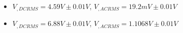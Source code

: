 \begin{itemize}
     \item $V_{, DCRMS}=4.59V\pm 0.01\unit{V}$, $V_{, ACRMS}=19.2mV\pm 0.01\unit{V}$ 
     \item $V_{, DCRMS}=6.88V\pm 0.01\unit{V}$, $V_{, ACRMS}=1.1068V\pm 0.01\unit{V}$\\
\end{itemize}